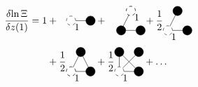 \documentclass[8.5pt,twoside,twocolumn]{article}
\theoremstyle{standard}
\begin{document}
\begin{equation}
\begin{aligned}
\delti{\ln\Xi}{z(1)}  =
1
&+
\fgbox{\begin{tikzpicture}[baseline=-.1cm]%
  \draw(0,0) node[circle,minimum size=.2cm,dashed,draw] (A) {};
  \draw(.7,0) node[circle,minimum size=.2cm,draw,fill=black] (B) {};
  \draw (A.east) --  (B.center);
  \node [below right] at (A) {1};
\end{tikzpicture}}
+\fgbox{
\begin{tikzpicture}[baseline=.25cm]
  \draw(0,0) node[circle,minimum size=.2cm,draw,fill=black] (A) {};
  \draw(.7,0) node[circle,minimum size=.2cm,draw,fill=black] (B) {};
  \draw(.35,.7) node[circle,minimum size=.2cm,dashed,draw] (C) {};
  \draw (A.center) --  (B.west);
  \draw (A.center) --  (C.center);
  \draw node[circle,minimum size=.2cm,draw,fill=white,dashed,opacity=1] at (C) {};
  \node [below right] at (C) {1};
\end{tikzpicture}}
+\frac 1 2
\begin{tikzpicture}[baseline=.25cm]
  \draw(.7,0) node[circle,minimum size=.2cm,draw,fill=black] (B) {};
  \draw(.35,.7) node[circle,minimum size=.2cm,draw,fill=black] (C) {};
  \draw (0,0) --  (B.center);
  \draw (0,0) --  (C.center);
  \draw(0,0) node[circle,minimum size=.2cm,draw,dashed,fill=white] (A) {};
  \node [below right] at (A) {1};
\end{tikzpicture}
\\&+ 
\frac 1 2
\begin{tikzpicture}[baseline=.25cm]
  \draw(0,0) node[circle,minimum size=.2cm,dashed,draw] (A) {};
  \draw(.7,0) node[circle,minimum size=.2cm,draw,fill=black] (B) {};
  \draw(.35,.7) node[circle,minimum size=.2cm,draw,fill=black] (C) {};
  \draw (A.center) --  (B.center);
  \draw (A.center) --  (C.center);
  \draw (B.center) --  (C.center);
  \draw node[circle,minimum size=.2cm,draw,dashed,fill=white,opacity=1] at (A) {};
  \node [below right] at (A) {1};
\end{tikzpicture}
 +
 \frac 1 2 
 \begin{tikzpicture}[baseline=.25cm]
  \draw(0,0) node[circle,minimum size=.2cm,dashed,draw] (A) {};
  \draw(.7,0) node[circle,minimum size=.2cm,draw,fill=black] (B) {};
  \draw(0,.7) node[circle,minimum size=.2cm,draw,fill=black] (C) {};
  \draw(.7,.7) node[circle,minimum size=.2cm,draw,fill=black] (D) {};
  \draw (A.east) --  (B.center);
  \draw (A.north) --  (C.center);
  \draw (B.center) --  (C.center);
  \draw (A.north east) --  (D.center);
  \node [below right] at (A) {1};
\end{tikzpicture}
+\ldots 
\end{aligned}
\end{equation}
\end{document}
